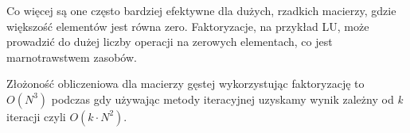 \documentclass{article}
\begin{document}
  Co więcej są one często bardziej efektywne dla dużych, rzadkich macierzy, gdzie większość elementów jest równa zero. Faktoryzacje, na przykład LU, może prowadzić do dużej liczby operacji na zerowych elementach, co jest marnotrawstwem zasobów.

  Złożoność obliczeniowa dla macierzy gęstej wykorzystując faktoryzację to $O(N^3)$ podczas gdy używając metody iteracyjnej uzyskamy wynik zależny od \textit{k} iteracji czyli $O(k \cdot N^2)$.
\end{document}
